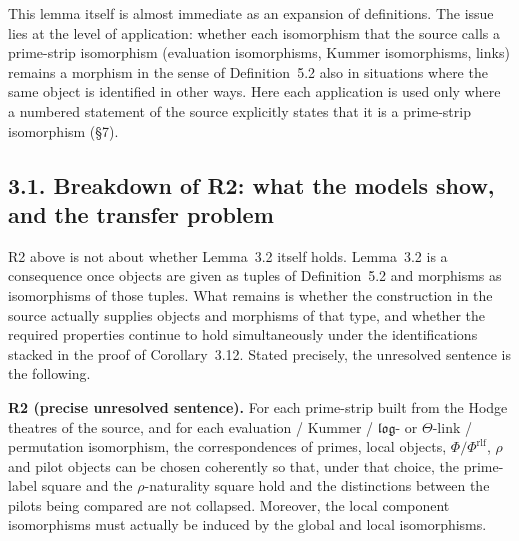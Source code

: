 \documentclass[11pt]{article}
\begin{document}
This lemma itself is almost immediate as an expansion of
definitions.  The issue lies at the level of application: whether
each isomorphism that the source calls a prime-strip isomorphism
(evaluation isomorphisms, Kummer isomorphisms, links) remains a
morphism in the sense of Definition~5.2 also in situations where
the same object is identified in other ways.  Here each application
is used only where a numbered statement of the source explicitly
states that it is a prime-strip isomorphism (\S7).

\subsection*{3.1. Breakdown of R2: what the models show, and the transfer problem}

R2 above is not about whether Lemma~3.2 itself holds.  Lemma~3.2
is a consequence once objects are given as tuples of
Definition~5.2 and morphisms as isomorphisms of those tuples.  What
remains is whether the construction in the source actually supplies
objects and morphisms of that type, and whether the required
properties continue to hold simultaneously under the identifications
stacked in the proof of Corollary~3.12.  Stated precisely, the
unresolved sentence is the following.

\medskip
\noindent\textbf{R2 (precise unresolved sentence).}
For each prime-strip built from the Hodge theatres of the source,
and for each evaluation / Kummer / $\mathfrak{log}$- or
$\Theta$-link / permutation isomorphism, the correspondences of
primes, local objects, $\Phi/\Phi^{\mathrm{rlf}}$, $\rho$ and pilot
objects can be chosen coherently so that, under that choice, the
prime-label square and the $\rho$-naturality square hold and the
distinctions between the pilots being compared are not collapsed.
Moreover, the local component isomorphisms must actually be induced
by the global and local isomorphisms.
\end{document}

